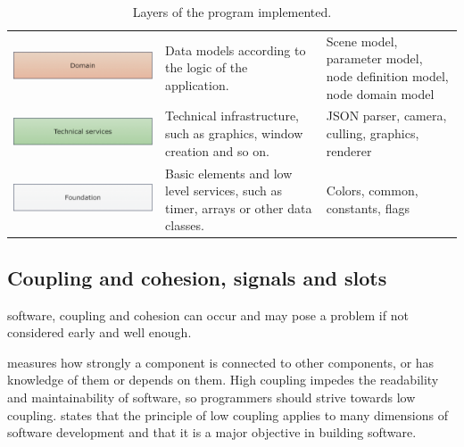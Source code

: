 \documentclass[%
    a4paper,    %
    justified,  %
    nobib,      %
    openany     %
]{tufte-book}
\makeatletter
\renewcommand{\label}[1]{\@tufte@label{##1}}%
\makeatother
\begin{document}
\begin{table}[h]
\begin{tabularx}{\textwidth}{XXX}
    \includegraphics[width=1.0\linewidth]{images/layers-domain}      & Data models according to the logic of the application.                              & Scene model, parameter model, node definition model, node domain model     \\
    \includegraphics[width=1.0\linewidth]{images/layers-technical}   & Technical infrastructure, such as graphics, window creation and so on.              & JSON parser, camera, culling, graphics, renderer                           \\
    \includegraphics[width=1.0\linewidth]{images/layers-foundation}  & Basic elements and low level services, such as timer, arrays or other data classes. & Colors, common, constants, flags                                           \\
    \bottomrule
  \end{tabularx}
  \vspace*{\baselineskip}
  \caption{Layers of the program implemented.}
  \label{table:results:layers}
\end{table}

\subsection{Coupling and cohesion, signals and slots}
\label{results:subsec:signals}

 software, coupling and cohesion
can occur and may pose a problem if not considered early and well enough.

 measures how strongly a component is connected to other
components, or has knowledge of them or depends on them. High coupling impedes
the readability and maintainability of software, so programmers should strive
towards low coupling.  states that the
principle of low coupling applies to many dimensions of software development and
that it is a major objective in building software.~\cite{larman-applying-2004}
\end{document}

